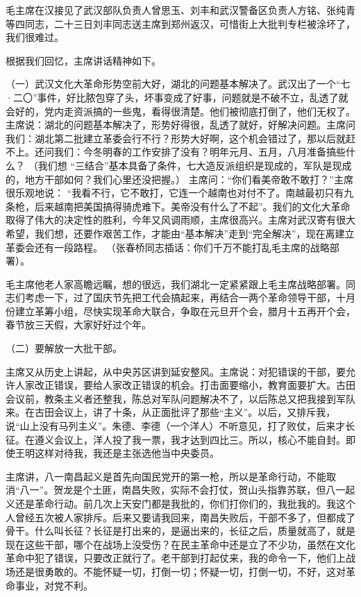{毛主席在汉接见了武汉部队负责人曾思玉、刘丰和武汉警备区负责人方铭、张纯青等四同志，二十三日刘丰同志送主席到郑州返汉，可惜街上大批判专栏被涂坏了，我们很难过。

根据我们回忆，主席讲话精神如下。

（一）武汉文化大革命形势空前大好，湖北的问题基本解决了。武汉出了一个“七·二〇”事件，好比脓包穿了头，坏事变成了好事，问题就是不破不立，乱透了就会好的，党内走资派搞的一些鬼，看得很清楚。他们被彻底打倒了，他们无权了。主席说：湖北的问题基本解决了，形势好得很，乱透了就好，好解决问题。主席问我们：湖北第二批建立革委会行不行？形势大好啊，这个机会错过了，那以后就赶不上。还问我们：今冬明春的工作安排了没有？明年元月、五月，八月准备搞些什么？  （我们想 “三结合”基本具备了条件，七大造反派组织是现成的，军队是现成的，地方干部如何？我们心里还没把握。） 主席问：“你们看美帝敢不敢打？”主席很乐观地说： “我看不行，它不敢打，它连一个越南也对付不了。南越最初只有九条枪，后来越南把美国搞得骑虎难下。美帝没有什么了不起”。我们的文化大革命取得了伟大的决定性的胜利，今年又风调雨顺，主席很高兴。主席对武汉寄有很大希望，我们想，还要作艰苦工作，才能由“基本解决”走到“完全解决”，现在离建立革委会还有一段路程。  （张春桥同志插话：你们千万不能打乱毛主席的战略部署）。

毛主席他老人家高瞻远瞩，想的很远，我们湖北一定紧紧跟上毛主席战略部署。同志们考虑一下，过了国庆节先把工代会搞起来，再结合一两个革命领导干部，十月份建立革筹小组，尽快实现革命大联合，争取在元旦开个会，腊月十五再开个会，春节放三天假，大家好好过个年。

（二）要解放一大批干部。

主席又从历史上讲起，从中央苏区讲到延安整风。主席说：对犯错误的干部，要允许人家改正错误，要给人家改正错误的机会。打击面要缩小，教育面要扩大。古田会议前，教条主义者还整我，陈总对军队问题解决不了，以后陈总又把我接到军队来。在古田会议上，讲了十条，从正面批评了那些“主义”。以后，又排斥我，说“山上没有马列主义”。朱德、李德（一个洋人）不听意见，打了败仗，后来才长征。在遵义会议上，洋人投了我一票，我才达到四比三。所以，核心不能自封。即使王明这样对待我，我还是主张选他当中央委员。

主席讲，八一南昌起义是首先向国民党开的第一枪，所以是革命行动，不能取消“八一”。贺龙是个土匪，南昌失败，实际不会打仗，贺山头指靠苏联，但八一起义还是革命行动。前几次上天安门都是我批的，你们打你们的，我批我的。我这个人曾经五次被人家排斥。后来又要请我回来，南昌失败后，干部不多了，但都成了骨干。什么叫长征？长征是打出来的，是逼出来的，长征之后，质量就高了，就是现在这些干部，哪个在战场上没受伤？在民主革命中还是立了不少功，虽然在文化革命中犯了错误，只要改正就行了。老干部到打起仗来，我的命令一下，他们上战场还是很勇敢的。不能怀疑一切，打倒一切；怀疑一切，打倒一切，不好，这对革命事业，对党不利。

}

